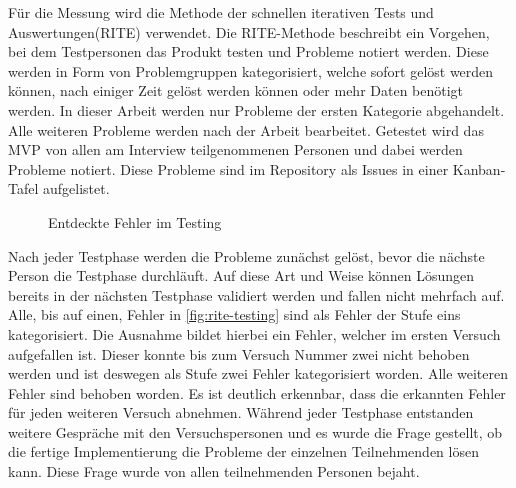 Für die Messung wird die Methode der schnellen iterativen Tests und Auswertungen(\ac{RITE}) verwendet\cite{rite-method}.
Die \ac{RITE}-Methode beschreibt ein Vorgehen, bei dem Testpersonen das Produkt testen und Probleme notiert werden. Diese werden in Form von Problemgruppen kategorisiert, welche sofort gelöst werden können, nach einiger Zeit gelöst werden können oder mehr Daten benötigt werden. In dieser Arbeit werden nur Probleme der ersten Kategorie abgehandelt. Alle weiteren Probleme werden nach der Arbeit bearbeitet. Getestet wird das \ac{MVP} von allen am Interview teilgenommenen Personen und dabei werden Probleme notiert. Diese Probleme sind im Repository als Issues in einer Kanban-Tafel aufgelistet.\\ 

\begin{figure}[H]
\centering
{}
\caption{\label{fig:rite-testing}Entdeckte Fehler im Testing}
\end{figure}

Nach jeder Testphase werden die Probleme zunächst gelöst, bevor die nächste Person die Testphase durchläuft. Auf diese Art und Weise können Lösungen bereits in der nächsten Testphase validiert werden und fallen nicht mehrfach auf. Alle, bis auf einen, Fehler in \autoref{fig:rite-testing} sind als Fehler der Stufe eins kategorisiert. Die Ausnahme bildet hierbei ein Fehler, welcher im ersten Versuch aufgefallen ist. Dieser konnte bis zum Versuch Nummer zwei nicht behoben werden und ist deswegen als Stufe zwei Fehler kategorisiert worden. Alle weiteren Fehler sind behoben worden. Es ist deutlich erkennbar, dass die erkannten Fehler für jeden weiteren Versuch abnehmen. Während jeder Testphase entstanden weitere Gespräche mit den Versuchspersonen und es wurde die Frage gestellt, ob die fertige Implementierung die Probleme der einzelnen Teilnehmenden lösen kann. Diese Frage wurde von allen teilnehmenden Personen bejaht.